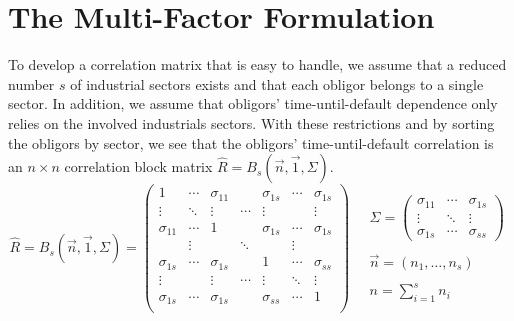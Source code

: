 \documentclass[11pt,fleqn]{book} %
\begin{document}
\section{The Multi-Factor Formulation}

To develop a correlation matrix that is easy to handle, we assume that a 
reduced number $s$ of industrial sectors exists and that each obligor belongs 
to a single sector. In addition, we assume that obligors' time-until-default 
dependence only relies on the involved industrials sectors. With these 
restrictions and by sorting the obligors by sector, we see that the obligors' 
time-until-default correlation is an $n {\times} n$ correlation block matrix 
$\widehat{R} = B_s(\vec{n},\vec{1},\Sigma)$.
\begin{displaymath}
	\widehat{R} = B_s(\vec{n},\vec{1},\Sigma) = 
	\left(
	\begin{array}{ccccccc}
		1           & \cdots & \sigma_{11} &        & \sigma_{1s} & \cdots & \sigma_{1s} \\
		\vdots      & \ddots & \vdots      & \cdots & \vdots      &        & \vdots      \\
		\sigma_{11} & \cdots & 1           &        & \sigma_{1s} & \cdots & \sigma_{1s} \\
		
		            & \vdots &             & \ddots &             & \vdots &             \\
		
		\sigma_{1s} & \cdots & \sigma_{1s} &        & 1           & \cdots & \sigma_{ss} \\
		\vdots      &        & \vdots      & \cdots & \vdots      & \ddots & \vdots      \\
		\sigma_{1s} & \cdots & \sigma_{1s} &        & \sigma_{ss} & \cdots & 1           \\
	\end{array}
	\right)
	\quad 
	\begin{array}{l}
		\Sigma = 
		\left(
		\begin{array}{ccc}
			\sigma_{11} & \cdots & \sigma_{1s} \\
			\vdots      & \ddots & \vdots      \\
			\sigma_{1s} & \cdots & \sigma_{ss}
		\end{array}
		\right) \\
		\\
		\vec{n} = (n_1,\dots,n_s) \\
		\\
		n = \displaystyle \sum_{i=1}^{s} n_i
	\end{array}
\end{displaymath}
\end{document}

